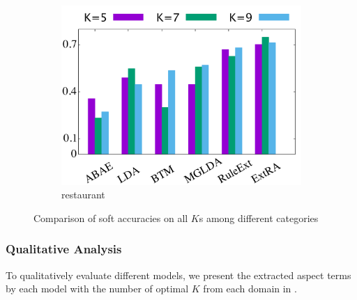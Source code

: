\begin{figure}[!ht]
\begin{subfigure}{.333\textwidth}
		\includegraphics[width=0.99\linewidth]{figures/restaurant_s}
		\caption{restaurant}
		\label{fig:restaurant_s}
	\end{subfigure}
	
	\caption{Comparison of soft accuracies on all $K$s among different categories }
	\label{fig:comparison_all_s}
\end{figure}

\subsubsection{Qualitative Analysis}

To qualitatively evaluate different models,
we present the extracted aspect terms
by each model with the number of optimal $K$
 from each domain in . 
 
